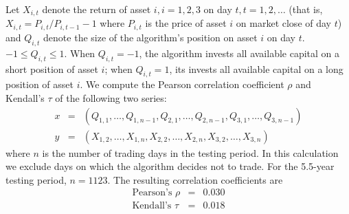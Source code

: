\documentclass[12pt]{article}
\begin{document}
Let $X_{i, t}$ denote the return of asset $i, i=1,2,3$ on day $t,
t=1,2, \dots$ (that is, $X_{i,t} = P_{i,t}/P_{i, t-1} - 1$ where
$P_{i,t}$ is the price of asset $i$ on market close of day $t$) and $Q_{i, t}$
denote the size of the algorithm's position on asset $i$ on day
$t$. $-1 \leq Q_{i,t} \leq 1$. When $Q_{i,t} = -1$, the algorithm
invests all available capital on a short position of asset $i$; when
$Q_{i,t} = 1$, its invests all available capital on a long position of
asset $i$. We compute the Pearson correlation coefficient $\rho$ and
Kendall's $\tau$ of the following two series:
\begin{eqnarray*}
  x &=& (Q_{1, 1}, \dots, Q_{1, n-1}, Q_{2, 1}, \dots, Q_{2, n-1}, Q_{3,
        1}, \dots, Q_{3, n-1}) \\
  y &=& (X_{1, 2}, \dots, X_{1, n}, X_{2, 2}, \dots, X_{2, n}, X_{3,
        2}, \dots, X_{3, n})
\end{eqnarray*}
where $n$ is the number of trading days in the testing period. In this
calculation we exclude days on which the algorithm decides not to
trade. For the 5.5-year testing period, $n=1123$. The resulting
correlation coefficients are
\begin{eqnarray*}
  \text{Pearson's } \rho &=& 0.030 \\
  \text{Kendall's } \tau &=& 0.018
\end{eqnarray*}
\end{document}
